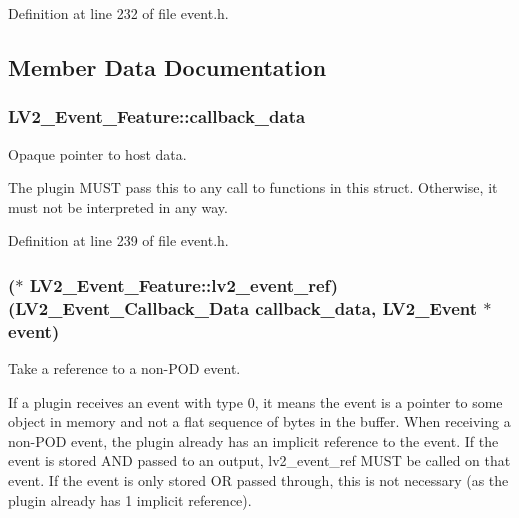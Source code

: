 Definition at line 232 of file event.\+h.



\subsection{Member Data Documentation}
\subsubsection[{\texorpdfstring{callback\+\_\+data}{callback_data}}]{ L\+V2\+\_\+\+Event\+\_\+\+Feature\+::callback\+\_\+data}\hypertarget{struct_l_v2___event___feature_a18b4fda679c0a9ea932dd3a5828686e1}{}\label{struct_l_v2___event___feature_a18b4fda679c0a9ea932dd3a5828686e1}
Opaque pointer to host data.

The plugin M\+U\+ST pass this to any call to functions in this struct. Otherwise, it must not be interpreted in any way. 

Definition at line 239 of file event.\+h.

\subsubsection[{\texorpdfstring{lv2\+\_\+event\+\_\+ref}{lv2_event_ref}}]{($\ast$ L\+V2\+\_\+\+Event\+\_\+\+Feature\+::lv2\+\_\+event\+\_\+ref) ({\bf L\+V2\+\_\+\+Event\+\_\+\+Callback\+\_\+\+Data} {\bf callback\+\_\+data}, {\bf L\+V2\+\_\+\+Event} $\ast$event)}\hypertarget{struct_l_v2___event___feature_a2ecce5a44b5ebf4af4a0edde874e183d}{}\label{struct_l_v2___event___feature_a2ecce5a44b5ebf4af4a0edde874e183d}
Take a reference to a non-\/\+P\+OD event.

If a plugin receives an event with type 0, it means the event is a pointer to some object in memory and not a flat sequence of bytes in the buffer. When receiving a non-\/\+P\+OD event, the plugin already has an implicit reference to the event. If the event is stored A\+ND passed to an output, lv2\+\_\+event\+\_\+ref M\+U\+ST be called on that event. If the event is only stored OR passed through, this is not necessary (as the plugin already has 1 implicit reference).


